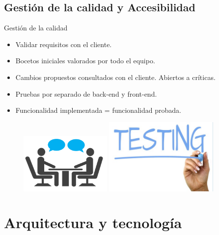 \documentclass{beamer}
\begin{document}
\subsection{Gesti\'on de la calidad y Accesibilidad}
	\begin{frame}{Gesti\'on de la calidad}
		\begin{itemize}
			\item {
				Validar requisitos con el cliente.
			}
			\item {
				Bocetos iniciales valorados por todo el equipo.
			}
			\item {
				Cambios propuestos consultados con el cliente. Abiertos a cr\'iticas.
			}
			\item {
				Pruebas por separado de back-end y front-end.
			}
			\item {
				Funcionalidad implementada = funcionalidad probada.
				
			}
		\end{itemize}
		
		
		\begin{figure}
    		\includegraphics[width=0.4\textwidth, height=0.5\textheight]{images_latex/conversacion}
    		\hspace{0.7cm}
    		\includegraphics[width=0.5\textwidth, height=0.5\textheight]{images_latex/testing}
		\end{figure}
	
	\end{frame}

\section{Arquitectura y tecnolog\'ia}
\end{document}
